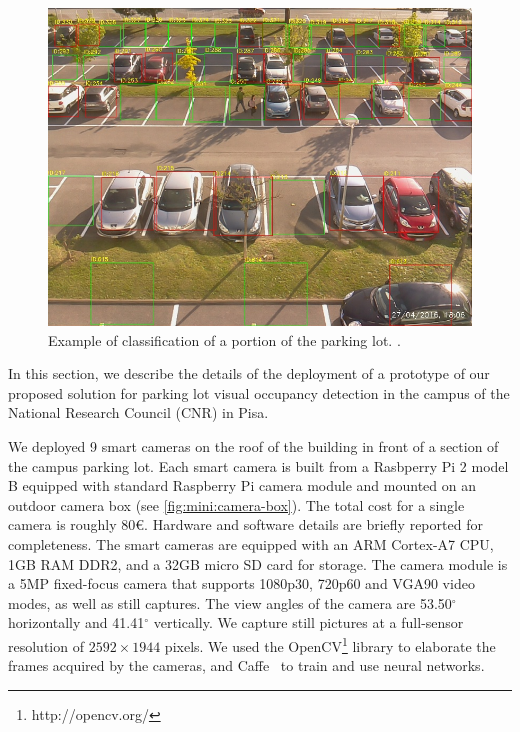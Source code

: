 \begin{figure}
	\centering
		\includegraphics[width=\columnwidth,trim={0 0 0 3.5ex},clip]{detection-example}
        \caption{Example of classification of a portion of the parking lot. .}
	\label{fig:mini:detection-example}
\end{figure}

In this section, we describe the details of the deployment of a prototype of our proposed solution for parking lot visual occupancy detection in the campus of the National Research Council (CNR) in Pisa.

We deployed 9 smart cameras on the roof of the building in front of a section of the campus parking lot.
Each smart camera is built from a Rasbperry Pi 2 model B equipped with standard Raspberry Pi camera module and mounted on an outdoor camera box (see \ref{fig:mini:camera-box}).
The total cost for a single camera is roughly 80\euro.
Hardware and software details are briefly reported for completeness.
The smart cameras are equipped with an ARM Cortex-A7 CPU, 1GB RAM DDR2, and a 32GB micro SD card for storage.
The camera module is a 5MP fixed-focus camera that supports 1080p30, 720p60 and VGA90 video modes, as well as still captures.
The view angles of the camera are 53.50$^{\circ}$ horizontally and 41.41$^{\circ}$ vertically.
We capture still pictures at a full-sensor resolution of $2592 \times 1944$ pixels.
We used the OpenCV\footnote{http://opencv.org/} library to elaborate the frames acquired by the cameras, and Caffe~\cite{jia2014caffe} to train and use neural networks.

